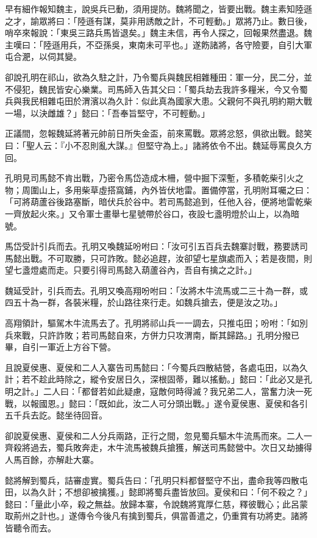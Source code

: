 早有細作報知魏主，說吳兵已動，須用提防。魏將聞之，皆要出戰。魏主素知陸遜之才，諭眾將曰：「陸遜有謀，莫非用誘敵之計，不可輕動。」眾將乃止。數日後，哨卒來報說：「東吳三路兵馬皆退矣。」魏主未信，再令人探之，回報果然盡退。魏主嘆曰：「陸遜用兵，不亞孫吳，東南未可平也。」遂飭諸將，各守險要，自引大軍屯合淝，以伺其變。

卻說孔明在祁山，欲為久駐之計，乃令蜀兵與魏民相雜種田：軍一分，民二分，並不侵犯，魏民皆安心樂業。司馬師入告其父曰：「蜀兵劫去我許多糧米，今又令蜀兵與我民相雜屯田於渭濱以為久計：似此真為國家大患。父親何不與孔明約期大戰一場，以決雌雄？」懿曰：「吾奉旨堅守，不可輕動。」

正議間，忽報魏延將著元帥前日所失金盃，前來罵戰。眾將忿怒，俱欲出戰。懿笑曰：「聖人云：『小不忍則亂大謀。』但堅守為上。」諸將依令不出。魏延辱罵良久方回。

孔明見司馬懿不肯出戰，乃密令馬岱造成木柵，營中掘下深塹，多積乾柴引火之物；周圍山上，多用柴草虛搭窩鋪，內外皆伏地雷。置備停當，孔明附耳囑之曰：「可將葫蘆谷後路塞斷，暗伏兵於谷中。若司馬懿追到，任他入谷，便將地雷乾柴一齊放起火來。」又令軍士畫舉七星號帶於谷口，夜設七盞明燈於山上，以為暗號。

馬岱受計引兵而去。孔明又喚魏延吩咐曰：「汝可引五百兵去魏寨討戰，務要誘司馬懿出戰。不可取勝，只可詐敗。懿必追趕，汝卻望七星旗處而入；若是夜間，則望七盞燈處而走。只要引得司馬懿入葫蘆谷內，吾自有擒之之計。」

魏延受計，引兵而去。孔明又喚高翔吩咐曰：「汝將木牛流馬或二三十為一群，或四五十為一群，各裝米糧，於山路往來行走。如魏兵搶去，便是汝之功。」

高翔領計，驅駕木牛流馬去了。孔明將祁山兵一一調去，只推屯田；吩咐：「如別兵來戰，只許詐敗；若司馬懿自來，方併力只攻渭南，斷其歸路。」孔明分撥已畢，自引一軍近上方谷下營。

且說夏侯惠、夏侯和二人入寨告司馬懿曰：「今蜀兵四散結營，各處屯田，以為久計；若不趁此時除之，縱令安居日久，深根固蒂，難以搖動。」懿曰：「此必又是孔明之計。」二人曰：「都督若如此疑慮，寇敵何時得滅？我兄弟二人，當奮力決一死戰，以報國恩。」懿曰：「既如此，汝二人可分頭出戰。」遂令夏侯惠、夏侯和各引五千兵去訖。懿坐待回音。

卻說夏侯惠、夏侯和二人分兵兩路，正行之間，忽見蜀兵驅木牛流馬而來。二人一齊殺將過去，蜀兵敗奔走，木牛流馬被魏兵搶獲，解送司馬懿營中。次日又劫擄得人馬百餘，亦解赴大寨。

懿將解到蜀兵，詰審虛實。蜀兵告曰：「孔明只料都督堅守不出，盡命我等四散屯田，以為久計；不想卻被擒獲。」懿即將蜀兵盡皆放回。夏侯和曰：「何不殺之？」懿曰：「量此小卒，殺之無益。放歸本寨，令說魏將寬厚仁慈，釋彼戰心；此呂蒙取荊州之計也。」遂傳令今後凡有擒到蜀兵，俱當善遣之，仍重賞有功將吏。諸將皆聽令而去。

